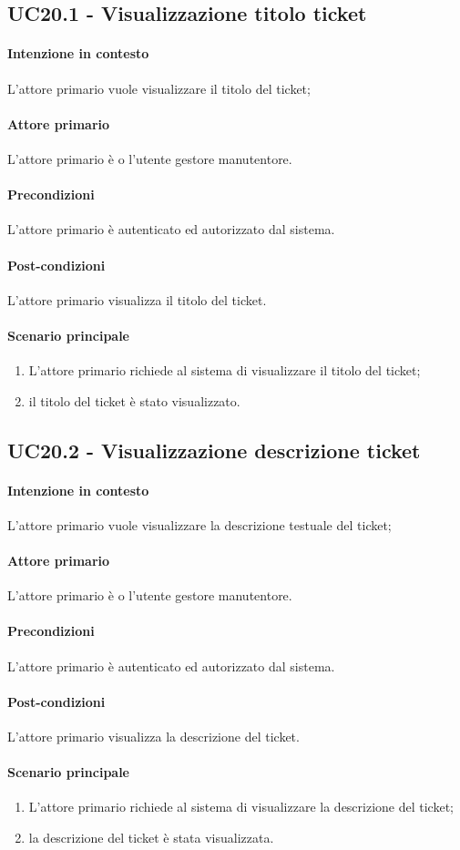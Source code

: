 \subsection{UC20.1 - Visualizzazione titolo ticket}\label{uc:20.1}

\paragraph{Intenzione in contesto} L'attore primario vuole visualizzare il titolo del ticket;
\paragraph{Attore primario} L'attore primario è o l'utente gestore manutentore.
\paragraph{Precondizioni}  L'attore primario è autenticato ed autorizzato dal sistema.
\paragraph{Post-condizioni} L'attore primario visualizza il titolo del ticket.
\paragraph{Scenario principale}
\begin{enumerate}
    \item L'attore primario richiede al sistema di visualizzare il titolo del ticket;
    \item il titolo del ticket è stato visualizzato.
\end{enumerate}

\subsection{UC20.2 - Visualizzazione descrizione ticket}\label{uc:20.2}

\paragraph{Intenzione in contesto} L'attore primario vuole visualizzare la descrizione testuale del ticket;
\paragraph{Attore primario} L'attore primario è o l'utente gestore manutentore.
\paragraph{Precondizioni}  L'attore primario è autenticato ed autorizzato dal sistema.
\paragraph{Post-condizioni} L'attore primario visualizza la descrizione del ticket.
\paragraph{Scenario principale}
\begin{enumerate}
    \item L'attore primario richiede al sistema di visualizzare la descrizione del ticket;
    \item la descrizione del ticket è stata visualizzata.
\end{enumerate}